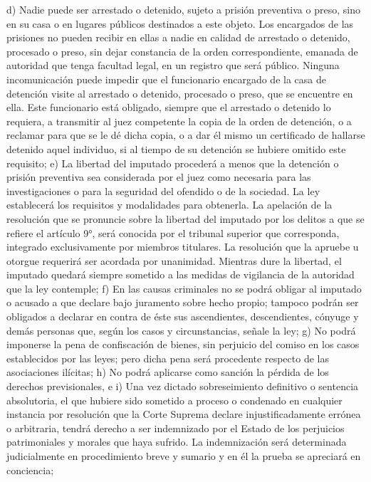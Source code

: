     d) Nadie puede ser arrestado o detenido, sujeto a prisión preventiva o preso, sino en su casa o en lugares públicos destinados a este objeto.
    Los encargados de las prisiones no pueden recibir en ellas a nadie en calidad de arrestado o detenido, procesado o preso, sin dejar constancia de la orden correspondiente, emanada de autoridad que tenga facultad legal, en un registro que será público.
    Ninguna incomunicación puede impedir que el funcionario encargado de la casa de detención visite al arrestado o detenido, procesado o preso, que se encuentre en ella. Este funcionario está obligado, siempre que el arrestado o detenido lo requiera, a transmitir al juez competente la copia de la orden de detención, o a reclamar para que se le dé dicha copia, o a dar él mismo un certificado de hallarse detenido aquel individuo, si al tiempo de su detención se hubiere omitido este requisito;
    e) La libertad del imputado procederá a menos que la detención o prisión preventiva sea considerada por el juez como necesaria para las investigaciones o para la seguridad del ofendido o de la sociedad. La ley establecerá los requisitos y modalidades para obtenerla.
    La apelación de la resolución que se pronuncie sobre la libertad del imputado por los delitos a que se refiere el artículo 9°, será conocida por el tribunal superior que corresponda, integrado exclusivamente por miembros titulares. La resolución que la apruebe u otorgue requerirá ser acordada por unanimidad. Mientras dure la libertad, el imputado quedará siempre sometido a las medidas de vigilancia de la autoridad que la ley contemple;
    f) En las causas criminales no se podrá obligar al imputado o acusado a que declare bajo juramento sobre hecho propio; tampoco podrán ser obligados a declarar en contra de éste sus ascendientes, descendientes, cónyuge y demás personas que, según los casos y circunstancias, señale la ley;
    g) No podrá imponerse la pena de confiscación de bienes, sin perjuicio del comiso en los casos establecidos por las leyes; pero dicha pena será procedente respecto de las asociaciones ilícitas;
    h) No podrá aplicarse como sanción la pérdida de los derechos previsionales, e
    i) Una vez dictado sobreseimiento definitivo o sentencia absolutoria, el que hubiere sido sometido a proceso o condenado en cualquier instancia por resolución que la Corte Suprema declare injustificadamente errónea o arbitraria, tendrá derecho a ser indemnizado por el Estado de los perjuicios patrimoniales y morales que haya sufrido. La indemnización será determinada judicialmente en procedimiento breve y sumario y en él la prueba se apreciará en conciencia;
